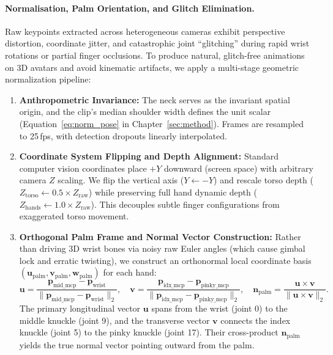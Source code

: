 \paragraph{Normalisation, Palm Orientation, and Glitch Elimination.}
Raw keypoints extracted across heterogeneous cameras exhibit perspective distortion, coordinate jitter, and catastrophic joint ``glitching'' during rapid wrist rotations or partial finger occlusions. To produce natural, glitch-free animations on 3D avatars and avoid kinematic artifacts, we apply a multi-stage geometric normalization pipeline:
\begin{enumerate}[leftmargin=*,itemsep=2pt]
  \item \textbf{Anthropometric Invariance:} The neck serves as the invariant spatial origin, and the clip's median shoulder width defines the unit scalar (Equation~\ref{eq:norm_pose} in Chapter~\ref{sec:method}). Frames are resampled to 25\,fps, with detection dropouts linearly interpolated.
  \item \textbf{Coordinate System Flipping and Depth Alignment:} Standard computer vision coordinates place $+Y$ downward (screen space) with arbitrary camera $Z$ scaling. We flip the vertical axis ($Y \gets -Y$) and rescale torso depth ($Z_{\text{torso}} \gets 0.5 \times Z_{\text{raw}}$) while preserving full hand dynamic depth ($Z_{\text{hands}} \gets 1.0 \times Z_{\text{raw}}$). This decouples subtle finger configurations from exaggerated torso movement.
  \item \textbf{Orthogonal Palm Frame and Normal Vector Construction:} Rather than driving 3D wrist bones via noisy raw Euler angles (which cause gimbal lock and erratic twisting), we construct an orthonormal local coordinate basis $(\mathbf{u}_{\text{palm}}, \mathbf{v}_{\text{palm}}, \mathbf{w}_{\text{palm}})$ for each hand:
  \begin{equation}
  \mathbf{u} = \frac{\mathbf{p}_{\text{mid\_mcp}} - \mathbf{p}_{\text{wrist}}}{\lVert \mathbf{p}_{\text{mid\_mcp}} - \mathbf{p}_{\text{wrist}} \rVert_2}, \quad
  \mathbf{v} = \frac{\mathbf{p}_{\text{idx\_mcp}} - \mathbf{p}_{\text{pinky\_mcp}}}{\lVert \mathbf{p}_{\text{idx\_mcp}} - \mathbf{p}_{\text{pinky\_mcp}} \rVert_2}, \quad
  \mathbf{n}_{\text{palm}} = \frac{\mathbf{u} \times \mathbf{v}}{\lVert \mathbf{u} \times \mathbf{v} \rVert_2}.
  \end{equation}
  The primary longitudinal vector $\mathbf{u}$ spans from the wrist (joint 0) to the middle knuckle (joint 9), and the transverse vector $\mathbf{v}$ connects the index knuckle (joint 5) to the pinky knuckle (joint 17). Their cross-product $\mathbf{n}_{\text{palm}}$ yields the true normal vector pointing outward from the palm.

\end{enumerate}

